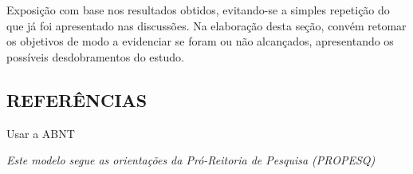 \documentclass[
  brazilian,
  12pt,
]{article}
\begin{document}
Exposição com base nos resultados obtidos, evitando-se a simples
repetição do que já foi apresentado nas discussões. Na elaboração desta
seção, convém retomar os objetivos de modo a evidenciar se foram ou não
alcançados, apresentando os possíveis desdobramentos do estudo.

\subsection*{REFERÊNCIAS}\label{referuxeancias}

Usar a ABNT

\emph{Este modelo segue as orientações da Pró-Reitoria de Pesquisa
(PROPESQ)}
\end{document}
